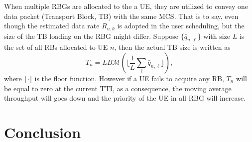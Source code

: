 \documentclass[journal]{IEEEtran}
\begin{document}
When multiple RBGs are allocated to the a UE, they are utilized to convey one data packet (Transport Block, TB) with the same MCS. That is to say, even though the estimated data rate $R_{n,k}$ is adopted in the user scheduling, but the size of the TB loading on the RBG might differ. Suppose $\{\bar{q}_{n,\ell}\}$ with size $L$ is the set of all RBs allocated to UE $n$, then the actual TB size is written as
\begin{equation}
T_n=LB\mathcal{M}\left(\bigg\lfloor\frac{1}{L}\sum_{\ell}\bar{q}_{n,\ell}\bigg\rfloor\right),
\end{equation}
where $\lfloor\cdot\rfloor$ is the floor function. However if a UE fails to acquire any RB, $T_n$ will be equal to zero at the current TTI, as a consequence, the moving average throughput will goes down and the priority of the UE in all RBG will increase.

\section{Conclusion}
    


\end{document}
